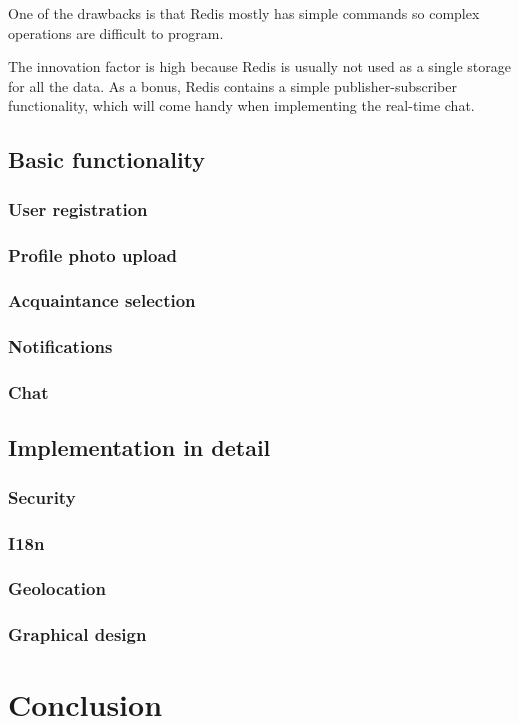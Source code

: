 \documentclass[12pt,oneside]{fithesis}
\begin{document}
		One of the drawbacks is that Redis mostly has simple commands so complex operations are difficult to program.
		
		The innovation factor is high because Redis is usually not used as a single storage for all the data. As a bonus, Redis contains a simple publisher-subscriber functionality, which will come handy when implementing the real-time chat.
\section{Basic functionality}
	\subsection{User registration}
	\subsection{Profile photo upload}
	\subsection{Acquaintance selection}
	\subsection{Notifications}
	\subsection{Chat}
\section{Implementation in detail}
	\subsection{Security}
	\subsection{I18n}
	\subsection{Geolocation}
	\subsection{Graphical design}
\chapter{Conclusion}


\end{document}

